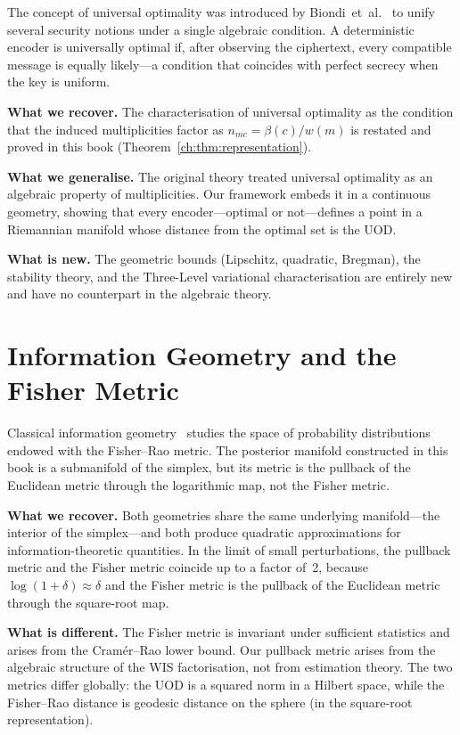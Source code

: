 The concept of universal optimality was introduced by
Biondi~et~al.~\cite{biondi2018apollonian} to unify several security
notions under a single algebraic condition.  A deterministic encoder
is universally optimal if, after observing the ciphertext, every
compatible message is equally likely---a condition that coincides with
perfect secrecy when the key is uniform.

\textbf{What we recover.}
The characterisation of universal optimality as the condition that the
induced multiplicities factor as $n_{mc}=\beta(c)/w(m)$ is restated
and proved in this book (Theorem~\ref{ch:thm:representation}).

\textbf{What we generalise.}
The original theory treated universal optimality as an algebraic
property of multiplicities.  Our framework embeds it in a continuous
geometry, showing that every encoder---optimal or not---defines a point
in a Riemannian manifold whose distance from the optimal set is the
UOD.

\textbf{What is new.}
The geometric bounds (Lipschitz, quadratic, Bregman), the stability
theory, and the Three-Level variational characterisation are entirely
new and have no counterpart in the algebraic theory.

\section{Information Geometry and the Fisher Metric}\label{ch:sec:comparison-fisher}

Classical information geometry~\cite{amari2016information} studies the
space of probability distributions endowed with the Fisher--Rao metric.
The posterior manifold constructed in this book is a submanifold of the
simplex, but its metric is the pullback of the Euclidean metric through
the logarithmic map, not the Fisher metric.

\textbf{What we recover.}
Both geometries share the same underlying manifold---the interior of
the simplex---and both produce quadratic approximations for
information-theoretic quantities.  In the limit of small
perturbations, the pullback metric and the Fisher metric coincide up
to a factor of~2, because $\log(1+\delta)\approx\delta$ and the
Fisher metric is the pullback of the Euclidean metric through the
square-root map.

\textbf{What is different.}
The Fisher metric is invariant under sufficient statistics and arises
from the Cram\'er--Rao lower bound.  Our pullback metric arises from
the algebraic structure of the WIS factorisation, not from estimation
theory.  The two metrics differ globally: the UOD is a squared norm
in a Hilbert space, while the Fisher--Rao distance is geodesic
distance on the sphere (in the square-root representation).

